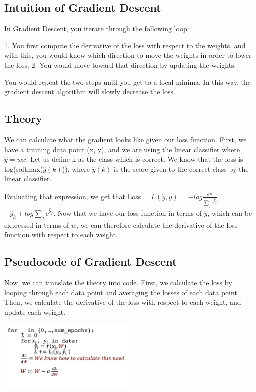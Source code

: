 \documentclass{article}
\begin{document}
\subsection{Intuition of Gradient Descent}

In Gradient Descent, you iterate through the following loop:

1. You first compute the derivative of the loss with respect to the weights, and with this, you would know which direction to move the weights in order to lower the loss.
2. You would move toward that direction by updating the weights.

You would repeat the two steps until you get to a local minima. In this way, the gradient descent algorithm will slowly decrease the loss.

\subsection{Theory}

We can calculate what the gradient looks like given our loss function. First, we have a training data point (x, y), and we are using the linear classifier where $\hat{y} = wx$. Let us define k as the class which is correct. We know that the loss is -log(softmax($\hat{y}(k)$)), where $\hat{y}(k)$ is the score given to the correct class by the linear classifier.

Evaluating that expression, we get that Loss = $L(\hat{y}, y)$ = $-log\frac{e^{\hat{y}_k}}{\sum_{j}e^{\hat{y}_j}}$ = $-\hat{y}_k + log\sum_j e^{\hat{y}_j}$. Now that we have our loss function in terms of $\hat{y}$, which can be expressed in terms of $w$, we can therefore calculate the derivative of the loss function with respect to each weight.

\subsection{Pseudocode of Gradient Descent}

Now, we can translate the theory into code. First, we calculate the loss by looping through each data point and averaging the losses of each data point. Then, we calculate the derivative of the loss with respect to each weight, and update each weight.

\includegraphics[width=250px]{gradient_descent_code.png}
\end{document}
